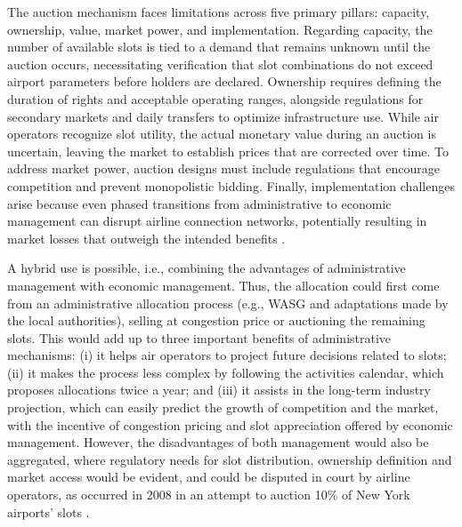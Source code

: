 The auction mechanism faces limitations across five primary pillars: capacity,
ownership, value, market power, and implementation.
%
Regarding capacity, the number of available slots is tied to a demand that
remains unknown until the auction occurs, necessitating verification that slot
combinations do not exceed airport parameters before holders are declared.
%
Ownership requires defining the duration of rights and acceptable operating
ranges, alongside regulations for secondary markets and daily transfers to
optimize infrastructure use.
%
While air operators recognize slot utility, the actual monetary value during an
auction is uncertain, leaving the market to establish prices that are corrected
over time.
%
To address market power, auction designs must include regulations that encourage
competition and prevent monopolistic bidding.
%
Finally, implementation challenges arise because even phased transitions from
administrative to economic management can disrupt airline connection networks,
potentially resulting in market losses that outweigh the intended benefits
\cite{ball2006auctions}.
%



A hybrid use is possible, i.e., combining the advantages of administrative
management with economic management.
%
Thus, the allocation could first come from an administrative allocation process
(e.g., \acrshort{WASG} and adaptations made by the local authorities), selling
at congestion price or auctioning the remaining slots.
%
This would add up to three important benefits of administrative mechanisms: (i)
it helps air operators to project future decisions related to slots; (ii) it
makes the process less complex by following the activities calendar, which
proposes allocations twice a year; and (iii) it assists in the long-term
industry projection, which can easily predict the growth of competition and the
market, with the incentive of congestion pricing and slot appreciation offered
by economic management.
%
However, the disadvantages of both management would also be aggregated, where
regulatory needs for slot distribution, ownership definition and market access
would be evident, and could be disputed in court by airline operators, as
occurred in 2008 in an attempt to auction 10\% of New York airports’ slots
\cite{cavusoglu2021minimum, gillen2016airport, BichlerAuction2022}.



